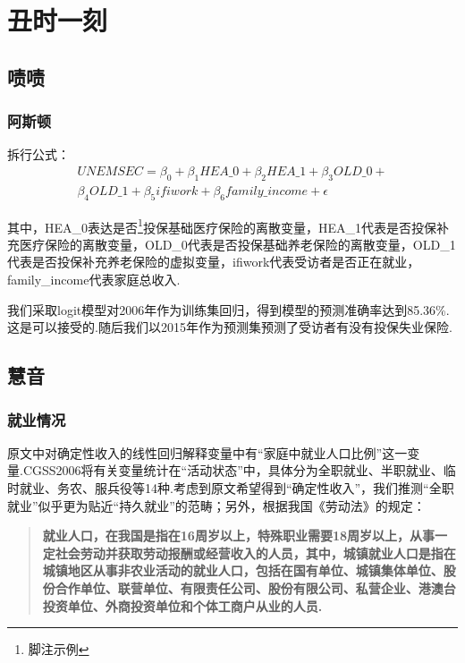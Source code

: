 \documentclass[a4paper,12pt]{report}
\begin{document}
\chapter{丑时一刻}
\section{啧啧}
\subsection{阿斯顿}
拆行公式：
\begin{equation*}
\begin{split}
   UNEMSEC = \beta_0 + \beta_1HEA\_0 + \beta_2HEA\_1 + \beta_3OLD\_0 +  \\
     \beta_4OLD\_1 + \beta_5ifiwork + \beta_6family\_income + \epsilon
\end{split}
\end{equation*}

其中，HEA\_0表达是否\footnote{脚注示例}投保基础医疗保险的离散变量，HEA\_1代表是否投保补充医疗保险的离散变量，OLD\_0代表是否投保基础养老保险的离散变量，OLD\_1代表是否投保补充养老保险的虚拟变量，ifiwork代表受访者是否正在就业，family\_income代表家庭总收入.

我们采取logit模型对2006年作为训练集回归，得到模型的预测准确率达到85.36\%.这是可以接受的.随后我们以2015年作为预测集预测了受访者有没有投保失业保险.



\section{慧音}
\subsection{就业情况}
原文中对确定性收入的线性回归解释变量中有“家庭中就业人口比例”这一变量.CGSS2006将有关变量统计在“活动状态”中，具体分为全职就业、半职就业、临时就业、务农、服兵役等14种.考虑到原文希望得到“确定性收入”，我们推测“全职就业”似乎更为贴近“持久就业”的范畴；另外，根据我国《劳动法》的规定：
\begin{quotation}
  \textbf{就业人口，在我国是指在16周岁以上，特殊职业需要18周岁以上，从事一定社会劳动并获取劳动报酬或经营收入的人员，其中，城镇就业人口是指在城镇地区从事非农业活动的就业人口，包括在国有单位、城镇集体单位、股份合作单位、联营单位、有限责任公司、股份有限公司、私营企业、港澳台投资单位、外商投资单位和个体工商户从业的人员.}
\end{quotation}
\end{document}
